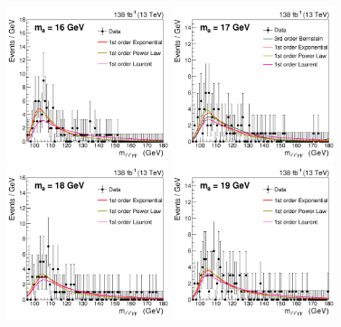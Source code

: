 \begin{figure}[htbp]
  \begin{center}
		\includegraphics[width=0.42\textwidth]{Thesis (Version 2246)/figures/chapter04/inter_mass_bkg/bkgplot_m16.pdf}
        \includegraphics[width=0.42\textwidth]{Thesis (Version 2246)/figures/chapter04/inter_mass_bkg/bkgplot_m17.pdf} \\
		\includegraphics[width=0.42\textwidth]{Thesis (Version 2246)/figures/chapter04/inter_mass_bkg/bkgplot_m18.pdf}
		\includegraphics[width=0.42\textwidth]{Thesis (Version 2246)/figures/chapter04/inter_mass_bkg/bkgplot_m19.pdf}\\
\end{center}
\end{figure}

